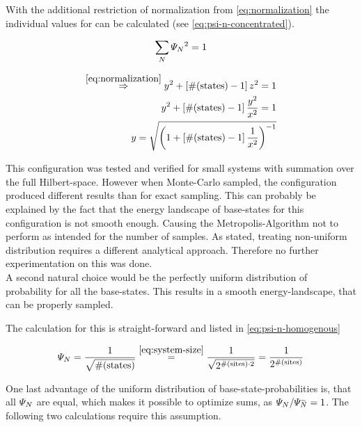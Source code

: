 With the additional restriction of normalization from \autoref{eq:normalization} the individual values for \psiN{} can be calculated (see \autoref{eq:psi-n-concentrated}).

\begin{equation}
    \label{eq:normalization}
    \lsum[N] \psiN{}^2 = 1
\end{equation}

\begin{equation}
    \label{eq:psi-n-concentrated}
    \begin{split}
        \stackrel{\ref{eq:normalization}}{\Rightarrow} y^2 + \left[\text{\#}(\text{states}) - 1 \right] z^2 = 1\\
        y^2 + \left[\text{\#}(\text{states}) - 1 \right] \frac{y^2}{x^2} = 1\\
        y = \sqrt{\left(1+\left[\text{\#}(\text{states}) - 1 \right]\frac{1}{x^2}\right)^{-1}}
    \end{split}
\end{equation}

This configuration was tested and verified for small systems with summation over the full Hilbert-space. 
However when Monte-Carlo sampled, the configuration produced different results than for exact sampling.
This can probably be explained by the fact that the energy landscape of base-states for this configuration is not smooth enough. 
Causing the Metropolis-Algorithm not to perform as intended for the number of samples.
As stated, treating non-uniform distribution requires a different analytical approach. Therefore no further experimentation on this was done.\\

A second natural choice would be the perfectly uniform distribution of probability for all the base-states. 
This results in a smooth energy-landscape, that can be properly sampled. 

The calculation for this is straight-forward and listed in \autoref{eq:psi-n-homogenous}

\begin{equation}
    \label{eq:psi-n-homogenous}
    \psiN{} = \frac{1}{\sqrt{\text{\#}(\text{states})}} \stackrel{\ref{eq:system-size}}{=} \frac{1}{\sqrt{2^{\text{\#}(\text{sites}) \cdot 2}}} = \frac{1}{2^{\text{\#}(\text{sites})}}
\end{equation}

One last advantage of the uniform distribution of base-state-probabilities is, that all $\varPsi_{N}$ are equal, which makes it possible to optimize sums, as $\psiN{}/\psiN[\vphantom{N}\smash{\tilde{N}}]{} = 1$.
The following two calculations require this assumption.

